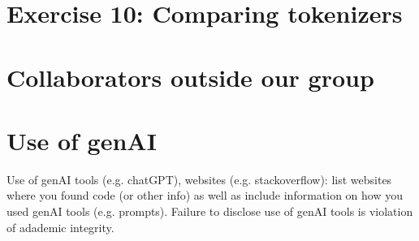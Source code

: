 \documentclass[11pt]{article}
\begin{document}
\section{Exercise 10: Comparing tokenizers}

%



\appendix

\section{Collaborators outside our group}



\section{Use of genAI}

Use of genAI tools (e.g. chatGPT), websites (e.g. stackoverflow): list websites where you found code (or other info) as well as include information on how you used genAI tools (e.g. prompts).  Failure to disclose use of genAI tools is violation of adademic integrity.

\end{document}
